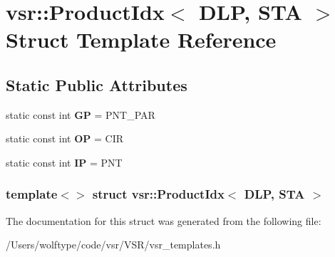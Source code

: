 \hypertarget{structvsr_1_1_product_idx_3_01_d_l_p_00_01_s_t_a_01_4}{\section{vsr\-:\-:Product\-Idx$<$ D\-L\-P, S\-T\-A $>$ Struct Template Reference}
\label{structvsr_1_1_product_idx_3_01_d_l_p_00_01_s_t_a_01_4}
}
\subsection*{Static Public Attributes}
\begin{DoxyCompactItemize}
\item 
\hypertarget{structvsr_1_1_product_idx_3_01_d_l_p_00_01_s_t_a_01_4_aee423499e1f7af78fef201b5a4deee63}{static const int {\bfseries G\-P} = P\-N\-T\-\_\-\-P\-A\-R}\label{structvsr_1_1_product_idx_3_01_d_l_p_00_01_s_t_a_01_4_aee423499e1f7af78fef201b5a4deee63}

\item 
\hypertarget{structvsr_1_1_product_idx_3_01_d_l_p_00_01_s_t_a_01_4_a298bf9b7d7d1d1c2c6796b9461ccf1c8}{static const int {\bfseries O\-P} = C\-I\-R}\label{structvsr_1_1_product_idx_3_01_d_l_p_00_01_s_t_a_01_4_a298bf9b7d7d1d1c2c6796b9461ccf1c8}

\item 
\hypertarget{structvsr_1_1_product_idx_3_01_d_l_p_00_01_s_t_a_01_4_a53bb29fff1442024f569e274b5cb5926}{static const int {\bfseries I\-P} = P\-N\-T}\label{structvsr_1_1_product_idx_3_01_d_l_p_00_01_s_t_a_01_4_a53bb29fff1442024f569e274b5cb5926}

\end{DoxyCompactItemize}
\subsubsection*{template$<$$>$ struct vsr\-::\-Product\-Idx$<$ D\-L\-P, S\-T\-A $>$}



The documentation for this struct was generated from the following file\-:\begin{DoxyCompactItemize}
\item 
/\-Users/wolftype/code/vsr/\-V\-S\-R/vsr\-\_\-templates.\-h\end{DoxyCompactItemize}
